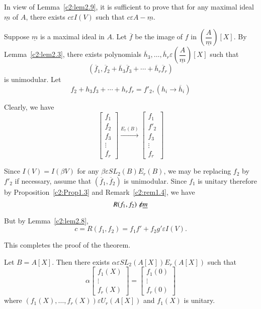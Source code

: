 \begin{Proof}
In view of Lemma~\ref{c2:lem2.9}, it is sufficient to prove that for
any maximal ideal $\underline{m}$ of $A$, there exists $c\varepsilon
I(V)$ such that $c\varepsilon A-\underline{m}$. 

Suppose $\underline{m}$ is a maximal ideal in $A$. Let $\overline{f}$
be the image of $f$ in $\left(\dfrac{A}{\underline{m}}\right)[X]$. By
Lemma~\ref{c2:lem2.3}, there exists polynomials
$\overline{h}_3,\ldots,\overline{h}_r \varepsilon
\left(\dfrac{A}{\underline{m}}\right)[X]$ such that 
$$
\left(\overline{f}_1,\overline{f}_2+\overline{h}_3\overline{f}_3+\cdots+\overline{h}_r\overline{f}_r\right)
$$
is unimodular. Let 
$$
f_2+h_3f_3+\cdots+h_rf_r=f'_2,\left(h_i\rightarrow \overline{h}_i\right)
$$

Clearly, we have
$$
\begin{bmatrix}
f_1\\
f_2\\
f_3\\
\vdots\\
f_r
\end{bmatrix} \xrightarrow{E_r(B)} \begin{bmatrix}
f_1\\
f'_2\\
f_3\\
\vdots\\
f_r
\end{bmatrix}
$$

Since $I(V)=I(\beta V)$ for any $\beta \varepsilon SL_2(B)E_r(B)$, we
may be replacing $f_2$ by $f'_2$ if necessary, assume that
$\left(\overline{f}_1,\overline{f}_2\right)$ is unimodular. Since
$f_1$ is unitary therefore by Proposition~\ref{c2:Prop1.3} and
Remark~\ref{c2:rem1.4}, we have 
$$
R(f_1,f_2)\not\kern-2pt\varepsilon \underline{m}
$$

But by Lemma~\ref{c2:lem2.8}, 
$$
c=R(f_1,f_2)=f_1f'+f_2g'\varepsilon I(V).
$$

This completes the proof of the theorem.
\enprf
\end{Proof}

\begin{coro}\label{c2:coro2.12}
Let $B=A[X]$. Then there exists $\alpha \varepsilon
SL_2(A[X])E_r(A[X])$ such that 
$$
\alpha
\begin{bmatrix}
f_1(X)\\
\vdots\\
f_r(X)
\end{bmatrix} = \begin{bmatrix}
f_1(0)\\
\vdots\\
f_r(0)
\end{bmatrix}
$$
where $(f_1(X),\ldots,f_r(X)) \varepsilon U_r(A[X])$ and $f_1(X)$ is unitary.
\end{coro}


